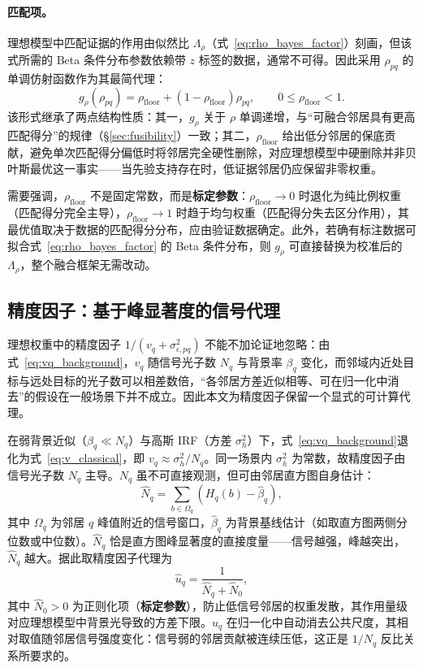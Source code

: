 \documentclass[11pt,a4paper]{ctexart}
\numberwithin{equation}{section}
\begin{document}
\paragraph{匹配项。}
理想模型中匹配证据的作用由似然比 $\Lambda_\rho$（式~\eqref{eq:rho_bayes_factor}）刻画，但该式所需的 Beta 条件分布参数依赖带 $z$ 标签的数据，通常不可得。因此采用 $\rho_{pq}$ 的单调仿射函数作为其最简代理：
\begin{equation}
    \boxed{
    g_{\rho}(\rho_{pq})
    =
    \rho_{\mathrm{floor}}
    +
    \left(1-\rho_{\mathrm{floor}}\right)\rho_{pq},
    \qquad
    0\leq\rho_{\mathrm{floor}}<1
    }.
    \label{eq:engineering_match_reliability}
\end{equation}
该形式继承了两点结构性质：其一，$g_\rho$ 关于 $\rho$ 单调递增，与``可融合邻居具有更高匹配得分''的规律（\S\ref{sec:fusibility}）一致；其二，$\rho_{\mathrm{floor}}$ 给出低分邻居的保底贡献，避免单次匹配得分偏低时将邻居完全硬性删除，对应理想模型中硬删除并非贝叶斯最优这一事实——当先验支持存在时，低证据邻居仍应保留非零权重。

需要强调，$\rho_{\mathrm{floor}}$ 不是固定常数，而是\textbf{标定参数}：$\rho_{\mathrm{floor}}\to0$ 时退化为纯比例权重（匹配得分完全主导），$\rho_{\mathrm{floor}}\to1$ 时趋于均匀权重（匹配得分失去区分作用），其最优值取决于数据的匹配得分分布，应由验证数据确定。此外，若确有标注数据可拟合式~\eqref{eq:rho_bayes_factor} 的 Beta 条件分布，则 $g_\rho$ 可直接替换为校准后的 $\Lambda_\rho$，整个融合框架无需改动。

\subsection{精度因子：基于峰显著度的信号代理}
\label{sec:precision_proxy}

理想权重中的精度因子 $1/(v_q+\sigma_{\epsilon,pq}^{2})$ 不能不加论证地忽略：由式~\eqref{eq:vq_background}，$v_q$ 随信号光子数 $N_q$ 与背景率 $\beta_q$ 变化，而邻域内近处目标与远处目标的光子数可以相差数倍，``各邻居方差近似相等、可在归一化中消去''的假设在一般场景下并不成立。因此本文为精度因子保留一个显式的可计算代理。

在弱背景近似（$\beta_q\ll N_q$）与高斯 IRF（方差 $\sigma_h^2$）下，式~\eqref{eq:vq_background}退化为式~\eqref{eq:v_classical}，即 $v_q\approx\sigma_h^2/N_q$。同一场景内 $\sigma_h^2$ 为常数，故精度因子由信号光子数 $N_q$ 主导。$N_q$ 虽不可直接观测，但可由邻居直方图自身估计：
\begin{equation}
    \hat N_q
    =
    \sum_{b\in\Omega_q}
    \left(H_q(b)-\hat\beta_q\right),
    \label{eq:signal_count_proxy}
\end{equation}
其中 $\Omega_q$ 为邻居 $q$ 峰值附近的信号窗口，$\hat\beta_q$ 为背景基线估计（如取直方图两侧分位数或中位数）。$\hat N_q$ 恰是直方图峰显著度的直接度量——信号越强，峰越突出，$\hat N_q$ 越大。据此取精度因子代理为
\begin{equation}
    \hat u_q
    =
    \frac{1}{\hat N_q+\hat N_0},
    \label{eq:precision_proxy}
\end{equation}
其中 $\hat N_0>0$ 为正则化项（\textbf{标定参数}），防止低信号邻居的权重发散，其作用量级对应理想模型中背景光导致的方差下限。$\hat u_q$ 在归一化中自动消去公共尺度，其相对取值随邻居信号强度变化：信号弱的邻居贡献被连续压低，这正是 $1/N_q$ 反比关系所要求的。
\end{document}

